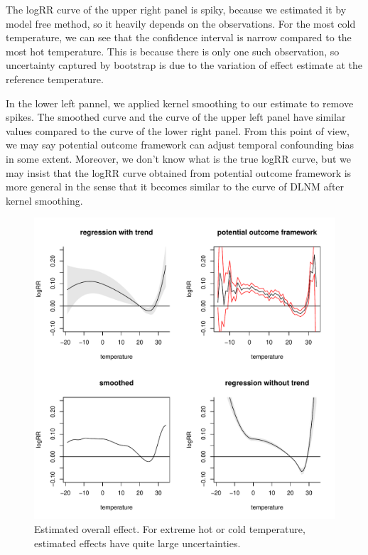 \documentclass[12pt]{article}
\begin{document}
The logRR curve of the upper right panel is spiky,
because we estimated it by model free method, so it heavily depends on the observations.
For the most cold temperature, 
we can see that the confidence interval is narrow compared to the most hot temperature.
This is because there is only one such observation,
so uncertainty captured by bootstrap is due to the variation of effect estimate at the reference temperature.

In the lower left pannel, we applied kernel smoothing to our estimate to remove spikes.
The smoothed curve and the curve of the upper left panel have similar values 
compared to the curve of the lower right panel.
From this point of view, 
we may say potential outcome framework can adjust temporal confounding bias in some extent.
Moreover, we don't know what is the true logRR curve,
but we may insist that the logRR curve obtained from potential outcome framework is more general
in the sense that it becomes similar to the curve of DLNM after kernel smoothing.

\begin{figure}
	\includegraphics[width = \textwidth]{figures/main1.pdf}
	\caption{Estimated overall effect. 
	For extreme hot or cold temperature, estimated effects have quite large uncertainties.}
	\label{figure:main}
\end{figure}
\end{document}
